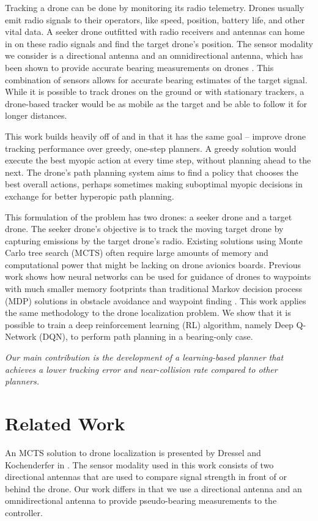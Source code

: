 \documentclass[10pt,twocolumn,letterpaper]{article}
\begin{document}
Tracking a drone can be done by monitoring its radio telemetry.
Drones usually emit radio signals to their operators, like speed, position, battery life, and other vital data. 
A seeker drone outfitted with radio receivers and antennas can home in on these radio signals and find the target drone's position.
The sensor modality we consider is a directional antenna and an omnidirectional antenna, which has been shown to provide accurate bearing measurements on drones \cite{sensor_modality}.
This combination of sensors allows for accurate bearing estimates of the target signal.
While it is possible to track drones on the ground or with stationary trackers, a drone-based tracker would be as mobile as the target and be able to follow it for longer distances.

This work builds heavily off of \cite{dronehunter} and \cite{kyle2} in that it has the same goal -- improve drone tracking performance over greedy, one-step planners.
A greedy solution would execute the best myopic action at every time step, without planning ahead to the next.
The drone's path planning system aims to find a policy that chooses the best overall actions, perhaps sometimes making suboptimal myopic decisions in exchange for better hyperopic path planning.

This formulation of the problem has two drones: a seeker drone and a target drone. 
The seeker drone's objective is to track the moving target drone by capturing emissions by the target drone's radio.
Existing solutions using Monte Carlo tree search (MCTS) often require large amounts of memory and computational power that might be lacking on drone avionics boards.
Previous work  shows how neural networks can be used for guidance of drones to waypoints with much smaller memory footprints than traditional Markov decision process (MDP) solutions in obstacle avoidance and waypoint finding \cite{kyle2}.
This work applies the same methodology to the drone localization problem.
We show that it is possible to train a deep reinforcement learning (RL) algorithm, namely Deep Q-Network (DQN), to perform path planning in a bearing-only case.

\textit{Our main contribution is the development of a learning-based planner that achieves a lower tracking error and near-collision rate compared to other planners.}

\section{Related Work}
An MCTS solution to drone localization is presented by Dressel and Kochenderfer in \cite{dronehunter}.
The sensor modality used in this work consists of two directional antennas that are used to compare signal strength in front of or behind the drone.
Our work differs in that we use a directional antenna and an omnidirectional antenna to provide pseudo-bearing measurements to the controller.
\end{document}
